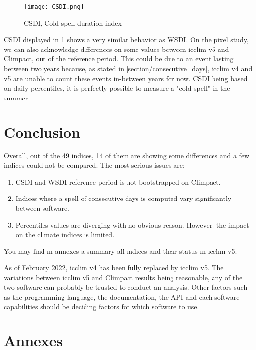\documentclass[a4paper,11pt]{article}
\begin{document}
        \begin{figure}[h]
            \centering
            \texttt{[image: CSDI.png]}
            \caption{CSDI, Cold-spell duration index}
            \label{figure/csdi}
        \end{figure}

        CSDI displayed in \ref{figure/csdi} shows a very similar behavior as WSDI.
        On the pixel study, we can also acknowledge differences on some values between icclim v5 and Climpact, out of the reference period.
        This could be due to an event lasting between two years because, as stated in \ref{section/consecutive_days}, icclim v4 and v5 are unable to count these events in-between years for now.
        CSDI being based on daily percentiles, it is perfectly possible to measure a "cold spell" in the summer. 

\part{Conclusion}
    Overall, out of the 49 indices, 14 of them are showing some differences and a few indices could not be compared.
    The most serious issues are:
    \begin{enumerate}
        \item CSDI and WSDI reference period is not bootstrapped on Climpact.
        \item Indices where a spell of consecutive days is computed vary significantly between software.
        \item Percentiles values are diverging with no obvious reason. However, the impact on the climate indices is limited.
    \end{enumerate}
    You may find in annexes a summary all indices and their status in icclim v5.

    As of February 2022, icclim v4 has been fully replaced by icclim v5.
    The variations between icclim v5 and Climpact results being reasonable, any of the two software can probably be trusted to conduct an analysis.
    Other factors such as the programming language, the documentation, the API and each software capabilities should be deciding factors for which software to use. 


\part{Annexes}
\end{document}

